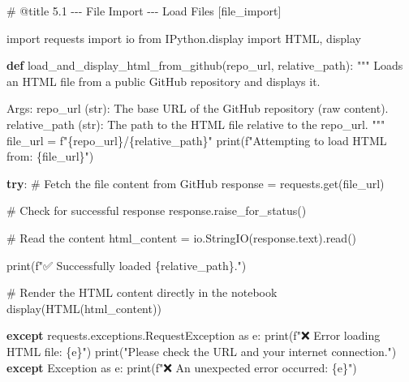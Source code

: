 \documentclass[
  11pt,
  letterpaper,
]{book}
\newenvironment{Shaded}{\begin{snugshade}}{\end{snugshade}}
\newcommand{\BuiltInTok}[1]{\textcolor[rgb]{0.00,0.23,0.31}{#1}}
\newcommand{\CommentTok}[1]{\textcolor[rgb]{0.37,0.37,0.37}{#1}}
\newcommand{\ControlFlowTok}[1]{\textcolor[rgb]{0.00,0.23,0.31}{\textbf{#1}}}
\newcommand{\ImportTok}[1]{\textcolor[rgb]{0.00,0.46,0.62}{#1}}
\newcommand{\KeywordTok}[1]{\textcolor[rgb]{0.00,0.23,0.31}{\textbf{#1}}}
\newcommand{\NormalTok}[1]{\textcolor[rgb]{0.00,0.23,0.31}{#1}}
\newcommand{\OperatorTok}[1]{\textcolor[rgb]{0.37,0.37,0.37}{#1}}
\newcommand{\PreprocessorTok}[1]{\textcolor[rgb]{0.68,0.00,0.00}{#1}}
\newcommand{\SpecialCharTok}[1]{\textcolor[rgb]{0.37,0.37,0.37}{#1}}
\newcommand{\SpecialStringTok}[1]{\textcolor[rgb]{0.13,0.47,0.30}{#1}}
\newcommand{\StringTok}[1]{\textcolor[rgb]{0.13,0.47,0.30}{#1}}
\begin{document}
\begin{Shaded}
\begin{Highlighting}[]
\CommentTok{\# @title 5.1 {-}{-}{-} File Import {-}{-}{-} Load Files [file\_import]}

\ImportTok{import}\NormalTok{ requests}
\ImportTok{import}\NormalTok{ io}
\ImportTok{from}\NormalTok{ IPython.display }\ImportTok{import}\NormalTok{ HTML, display}

\KeywordTok{def}\NormalTok{ load\_and\_display\_html\_from\_github(repo\_url, relative\_path):}
    \CommentTok{"""}
\CommentTok{    Loads an HTML file from a public GitHub repository and displays it.}

\CommentTok{    Args:}
\CommentTok{        repo\_url (str): The base URL of the GitHub repository (raw content).}
\CommentTok{        relative\_path (str): The path to the HTML file relative to the repo\_url.}
\CommentTok{    """}
\NormalTok{    file\_url }\OperatorTok{=} \SpecialStringTok{f"}\SpecialCharTok{\{}\NormalTok{repo\_url}\SpecialCharTok{\}}\SpecialStringTok{/}\SpecialCharTok{\{}\NormalTok{relative\_path}\SpecialCharTok{\}}\SpecialStringTok{"}
    \BuiltInTok{print}\NormalTok{(}\SpecialStringTok{f"Attempting to load HTML from: }\SpecialCharTok{\{}\NormalTok{file\_url}\SpecialCharTok{\}}\SpecialStringTok{"}\NormalTok{)}

    \ControlFlowTok{try}\NormalTok{:}
        \CommentTok{\# Fetch the file content from GitHub}
\NormalTok{        response }\OperatorTok{=}\NormalTok{ requests.get(file\_url)}

        \CommentTok{\# Check for successful response}
\NormalTok{        response.raise\_for\_status()}

        \CommentTok{\# Read the content}
\NormalTok{        html\_content }\OperatorTok{=}\NormalTok{ io.StringIO(response.text).read()}

        \BuiltInTok{print}\NormalTok{(}\SpecialStringTok{f"✅ Successfully loaded }\SpecialCharTok{\{}\NormalTok{relative\_path}\SpecialCharTok{\}}\SpecialStringTok{."}\NormalTok{)}

        \CommentTok{\# Render the HTML content directly in the notebook}
\NormalTok{        display(HTML(html\_content))}

    \ControlFlowTok{except}\NormalTok{ requests.exceptions.RequestException }\ImportTok{as}\NormalTok{ e:}
        \BuiltInTok{print}\NormalTok{(}\SpecialStringTok{f"❌ Error loading HTML file: }\SpecialCharTok{\{}\NormalTok{e}\SpecialCharTok{\}}\SpecialStringTok{"}\NormalTok{)}
        \BuiltInTok{print}\NormalTok{(}\StringTok{"Please check the URL and your internet connection."}\NormalTok{)}
    \ControlFlowTok{except} \PreprocessorTok{Exception} \ImportTok{as}\NormalTok{ e:}
        \BuiltInTok{print}\NormalTok{(}\SpecialStringTok{f"❌ An unexpected error occurred: }\SpecialCharTok{\{}\NormalTok{e}\SpecialCharTok{\}}\SpecialStringTok{"}\NormalTok{)}


\end{Highlighting}
\end{Shaded}
\end{document}
